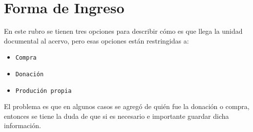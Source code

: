 \documentclass[10pt,letterpaper]{article}
\begin{document}
\section{Forma de Ingreso}
En este rubro se tienen tres opciones para describir cómo es que llega la unidad documental al acervo, pero esas opciones están restringidas a:

\begin{itemize}
	\item \texttt{Compra}
	\item \texttt{Donación}
	\item \texttt{Produción propia}
\end{itemize}

El problema es que en algunos casos se agregó de quién fue la donación o compra, entonces se tiene la duda de que si es necesario e importante guardar dicha información.
\end{document}
